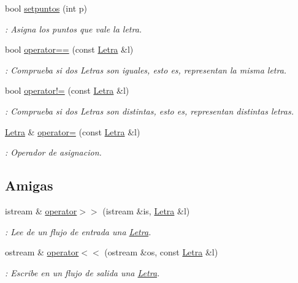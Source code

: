\begin{DoxyCompactItemize}
bool \hyperlink{classLetra_a472f24ed48a494a80fff9f34306fac13}{setpuntos} (int p)
\begin{DoxyCompactList}\small\item\em \+: Asigna los puntos que vale la letra. \end{DoxyCompactList}\item 
bool \hyperlink{classLetra_aabf3e986f008c943f73d8451698083c4}{operator==} (const \hyperlink{classLetra}{Letra} \&l)
\begin{DoxyCompactList}\small\item\em \+: Comprueba si dos Letras son iguales, esto es, representan la misma letra. \end{DoxyCompactList}\item 
bool \hyperlink{classLetra_a52e35828c5d6d938000777e94fa8328f}{operator!=} (const \hyperlink{classLetra}{Letra} \&l)
\begin{DoxyCompactList}\small\item\em \+: Comprueba si dos Letras son distintas, esto es, representan distintas letras. \end{DoxyCompactList}\item 
\hyperlink{classLetra}{Letra} \& \hyperlink{classLetra_ace664abba8bf62853a2fa3ea77701747}{operator=} (const \hyperlink{classLetra}{Letra} \&l)
\begin{DoxyCompactList}\small\item\em \+: Operador de asignacion. \end{DoxyCompactList}\end{DoxyCompactItemize}
\subsection*{Amigas}
\begin{DoxyCompactItemize}
\item 
istream \& \hyperlink{classLetra_a7cfdbed3a9a9638fe240a3789b77e50a}{operator$>$$>$} (istream \&is, \hyperlink{classLetra}{Letra} \&l)
\begin{DoxyCompactList}\small\item\em \+: Lee de un flujo de entrada una \hyperlink{classLetra}{Letra}. \end{DoxyCompactList}\item 
ostream \& \hyperlink{classLetra_a4573c7158ebe767aa30315296da42a3a}{operator$<$$<$} (ostream \&os, const \hyperlink{classLetra}{Letra} \&l)
\begin{DoxyCompactList}\small\item\em \+: Escribe en un flujo de salida una \hyperlink{classLetra}{Letra}. \end{DoxyCompactList}\end{DoxyCompactItemize}


